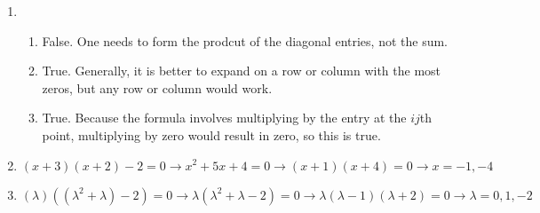 \documentclass[12pt]{article}
\begin{document}
\begin{enumerate}

  \item 

    \begin{enumerate}

      \item False. One needs to form the prodcut of the diagonal entries, not the sum.

      \item True. Generally, it is better to expand on a row or column with the most zeros, but any row or column would work.

      \item True. Because the formula involves multiplying by the entry at the $ij$th point, multiplying by zero would result in zero, so this is true.

    \end{enumerate}

  \item $(x+3)(x+2)-2=0\rightarrow x^2+5x+4=0\rightarrow (x+1)(x+4)=0\rightarrow x=-1,-4$

    \setcounter{enumi}{50}

  \item $(\lambda)\left( (\lambda^2+\lambda)-2 \right)=0\rightarrow \lambda\left( \lambda^2+\lambda-2 \right)=0\rightarrow \lambda(\lambda-1)(\lambda+2)=0\rightarrow\lambda=0,1,-2$


\end{enumerate}
\end{document}
